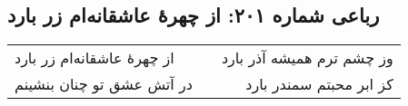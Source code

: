 \begin{center}
\section*{رباعی شماره ۲۰۱: از چهرهٔ عاشقانه‌ام زر بارد}
\label{sec:sh201}
\begin{longtable}{l p{0.5cm} r}
از چهرهٔ عاشقانه‌ام زر بارد
&&
وز چشم ترم همیشه آذر بارد
\\
در آتش عشق تو چنان بنشینم
&&
کز ابر محبتم سمندر بارد
\\
\end{longtable}
\end{center}
